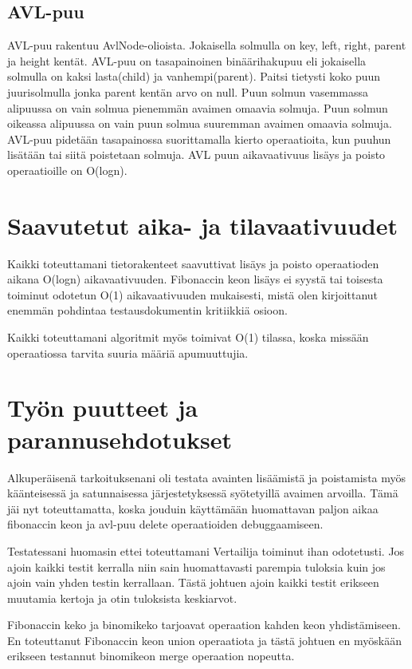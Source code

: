 \documentclass[11pt,a4paper]{article}
\begin{document}
\subsection{AVL-puu}
AVL-puu rakentuu AvlNode-olioista. Jokaisella solmulla on key, left, right, parent ja height kentät\cite{tira}.
AVL-puu on tasapainoinen binäärihakupuu eli jokaisella solmulla on kaksi lasta(child) ja vanhempi(parent). Paitsi tietysti koko puun juurisolmulla jonka parent kentän arvo on null. Puun solmun vasemmassa alipuussa on vain solmua pienemmän avaimen omaavia solmuja. Puun solmun oikeassa alipuussa on vain puun solmua suuremman avaimen omaavia solmuja. AVL-puu pidetään tasapainossa suorittamalla kierto operaatioita, kun puuhun lisätään tai siitä poistetaan solmuja. AVL puun aikavaativuus lisäys ja poisto operaatioille on O(logn)\cite{avl}. 
\section{Saavutetut aika- ja tilavaativuudet}
Kaikki toteuttamani tietorakenteet saavuttivat lisäys ja poisto operaatioden aikana O(logn) aikavaativuuden. Fibonaccin keon lisäys ei syystä tai toisesta toiminut odotetun O(1) aikavaativuuden mukaisesti, mistä olen kirjoittanut enemmän pohdintaa testausdokumentin kritiikkiä osioon.

Kaikki toteuttamani algoritmit myös toimivat O(1) tilassa, koska missään operaatiossa tarvita suuria määriä apumuuttujia.
\section{Työn puutteet ja parannusehdotukset}
Alkuperäisenä tarkoituksenani oli testata avainten lisäämistä ja poistamista myös käänteisessä ja satunnaisessa järjestetyksessä syötetyillä avaimen arvoilla. Tämä jäi nyt toteuttamatta, koska jouduin käyttämään huomattavan paljon aikaa fibonaccin keon ja avl-puu delete operaatioiden debuggaamiseen. 

Testatessani huomasin ettei toteuttamani Vertailija toiminut ihan odotetusti. Jos ajoin kaikki testit kerralla niin sain huomattavasti parempia tuloksia kuin jos ajoin vain yhden testin kerrallaan. Tästä johtuen ajoin kaikki testit erikseen muutamia kertoja ja otin tuloksista keskiarvot.

Fibonaccin keko ja binomikeko tarjoavat operaation kahden keon yhdistämiseen. En toteuttanut Fibonaccin keon union operaatiota ja tästä johtuen en myöskään erikseen testannut binomikeon merge operaation nopeutta. 
\end{document}
